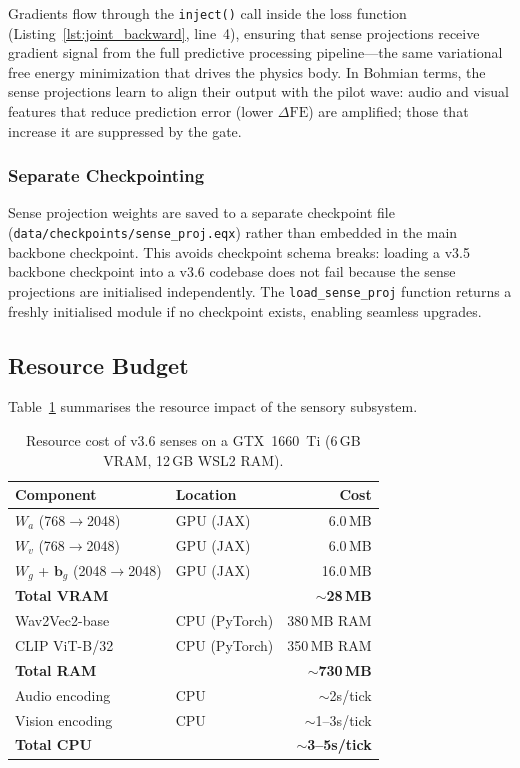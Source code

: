Gradients flow through the \texttt{inject()} call inside the loss function (Listing~\ref{lst:joint_backward}, line~4), ensuring that sense projections receive gradient signal from the full predictive processing pipeline---the same variational free energy minimization that drives the physics body.
In Bohmian terms, the sense projections learn to align their output with the pilot wave: audio and visual features that reduce prediction error (lower $\Delta\mathrm{FE}$) are amplified; those that increase it are suppressed by the gate.

\subsubsection{Separate Checkpointing}

Sense projection weights are saved to a separate checkpoint file (\texttt{data/checkpoints/sense\_proj.eqx}) rather than embedded in the main backbone checkpoint.
This avoids checkpoint schema breaks: loading a v3.5 backbone checkpoint into a v3.6 codebase does not fail because the sense projections are initialised independently.
The \texttt{load\_sense\_proj} function returns a freshly initialised module if no checkpoint exists, enabling seamless upgrades.

\subsection{Resource Budget}
\label{sec:sense_resources}

Table~\ref{tab:sense_resources} summarises the resource impact of the sensory subsystem.

\begin{table}[h]
\centering
\caption{Resource cost of v3.6 senses on a GTX~1660~Ti (6\,GB VRAM, 12\,GB WSL2 RAM).}
\label{tab:sense_resources}
\small
\begin{tabularx}{\columnwidth}{lXr}
\toprule
\textbf{Component} & \textbf{Location} & \textbf{Cost} \\
\midrule
$W_a$ (768$\to$2048) & GPU (JAX) & 6.0\,MB \\
$W_v$ (768$\to$2048) & GPU (JAX) & 6.0\,MB \\
$W_g$ + $\mathbf{b}_g$ (2048$\to$2048) & GPU (JAX) & 16.0\,MB \\
\rowcolor{gray!10}
\textbf{Total VRAM} & & \textbf{$\sim$28\,MB} \\
\midrule
Wav2Vec2-base & CPU (PyTorch) & 380\,MB RAM \\
CLIP ViT-B/32 & CPU (PyTorch) & 350\,MB RAM \\
\rowcolor{gray!10}
\textbf{Total RAM} & & \textbf{$\sim$730\,MB} \\
\midrule
Audio encoding & CPU & $\sim$2s/tick \\
Vision encoding & CPU & $\sim$1--3s/tick \\
\rowcolor{gray!10}
\textbf{Total CPU} & & \textbf{$\sim$3--5s/tick} \\
\bottomrule
\end{tabularx}
\end{table}

